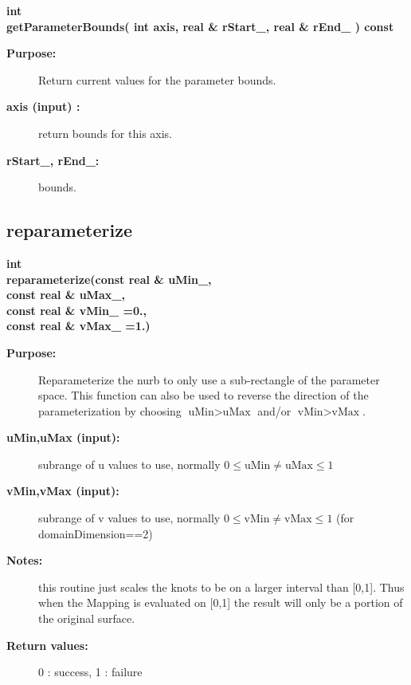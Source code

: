 \begin{flushleft} \textbf{%
int   \\ 
\settowidth{\NurbsMappingIncludeArgIndent}{getParameterBounds(}%
getParameterBounds( int axis, real \& rStart\_, real \& rEnd\_ ) const
}\end{flushleft}
\begin{description}
\item[{\bf Purpose:}]  
   Return current values for the parameter bounds.
\item[{\bf axis (input) :}]  return bounds for this axis.
\item[{\bf rStart\_, rEnd\_:}]  bounds.
\end{description}
\subsection{reparameterize}
 
\begin{flushleft} \textbf{%
int   \\ 
\settowidth{\NurbsMappingIncludeArgIndent}{reparameterize(}%
reparameterize(const real \& uMin\_, \\ 
\hspace{\NurbsMappingIncludeArgIndent}const real \& uMax\_,\\ 
\hspace{\NurbsMappingIncludeArgIndent}const real \& vMin\_  =0., \\ 
\hspace{\NurbsMappingIncludeArgIndent}const real \& vMax\_  =1.)
}\end{flushleft}
\begin{description}
\item[{\bf Purpose:}]  Reparameterize the nurb to only use a sub-rectangle of the parameter space.
    This function can also be used to reverse the direction of the parameterization by choosing
   $\mbox{uMin} > \mbox{uMax}$ and/or $\mbox{vMin} > \mbox{vMax}$.
\item[{\bf uMin,uMax (input):}]   subrange of u values to use, normally $0 \le \mbox{uMin} \ne \mbox{uMax} \le 1$
\item[{\bf vMin,vMax (input):}]  subrange of v values to use, normally  $0 \le \mbox{vMin} \ne \mbox{vMax} \le 1$ 
     (for domainDimension==2)

\item[{\bf Notes:}]  this routine just scales the knots to be on a larger interval than [0,1]. Thus when
    the Mapping is evaluated on [0,1] the result will only be a portion of the original surface.
\item[{\bf Return values:}]  0 : success,  1 : failure
\end{description}
